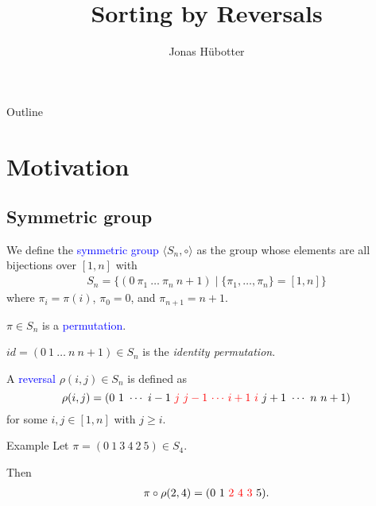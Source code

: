 \documentclass{beamer}
\title[Sorting by Reversals]{Sorting by Reversals}
\author{Jonas Hübotter}
\theoremstyle{definition}
\def\spadding{\vspace{0.25cm}}
\def\b{\textcolor{blue}}
\def\r{\textcolor{red}}
\begin{document}
\begin{frame}
  \titlepage
\end{frame}

\begin{frame}{Outline}
 \tableofcontents
\end{frame}

\section{Motivation}

\subsection{Symmetric group}

\begin{frame}

\begin{definition}
We define the \b{symmetric group} $\langle S_n, \circ \rangle$ as the group whose elements are all bijections over $[1,n]$ \pause with
\begin{align*}
    S_n = \{(0\ \pi_1\ \dots\ \pi_n\ n+1) \mid \{\pi_1, \dots, \pi_n\} = [1,n]\}
\end{align*}
where $\pi_i = \pi(i)$, $\pi_0 = 0$, and $\pi_{n+1} = n+1$.\pause\spadding

$\pi \in S_n$ is a \b{permutation}.\pause\spadding

$id = (0\ 1\ \dots\ n\ n+1) \in S_n$ is the \textit{identity permutation}.
\end{definition}

\end{frame}

\begin{frame}

\begin{definition}
A \b{reversal} $\rho(i,j) \in S_n$ is defined as
\[
    \rho(i,j) = (0\ 1\ \cdots\ i-1\ \r j\ \r{j-1}\ \r \cdots\ \r{i+1}\ \r i\ j+1\ \cdots\ n\ n+1)
\]
for some $i, j \in [1, n]$ with $j \geq i$.
\end{definition}\pause

\begin{exampleblock}{Example}
Let $\pi = (0\ 1\ 3\ 4\ 2\ 5) \in S_4$. \par
Then
\begin{align*}
    \pi \circ \rho(2,4) = (0\ 1\ \r{2\ 4\ 3}\ 5).
\end{align*}
\end{exampleblock}

\end{frame}
\end{document}
